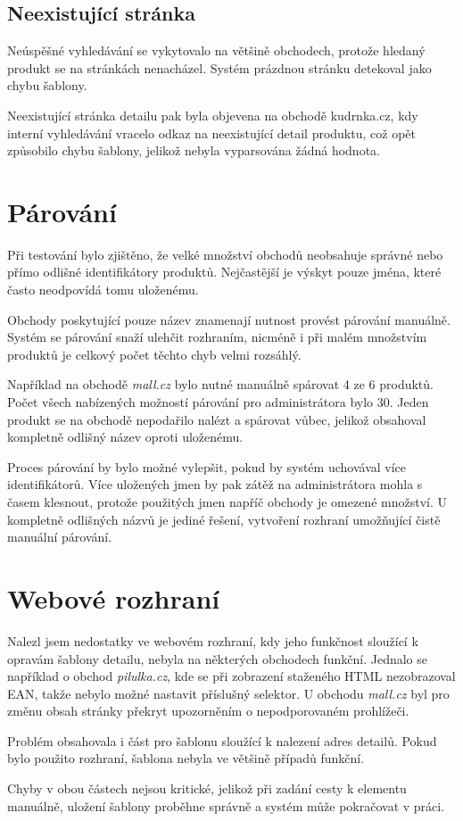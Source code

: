 \documentclass[thesis=B,czech]{FITthesis}[2012/06/26]
\begin{document}
\subsection{Neexistující stránka}
Neúspěšné vyhledávání se vykytovalo na většině obchodech, protože hledaný produkt se na stránkách nenacházel. Systém prázdnou stránku detekoval jako chybu šablony.
\par
Neexistující stránka detailu pak byla objevena na obchodě kudrnka.cz, kdy interní vyhledávání vracelo odkaz na neexistující detail produktu, což opět způsobilo chybu šablony, jelikož nebyla vyparsována žádná hodnota.

\section{Párování}
Při testování bylo zjištěno, že velké množství obchodů neobsahuje správné nebo přímo odlišné identifikátory produktů. Nejčastější je výskyt pouze jména, které často neodpovídá tomu uloženému.
\par
Obchody poskytující pouze název znamenají nutnost provést párování manuálně. Systém se párování snaží ulehčit rozhraním, nicméně i při malém množstvím produktů je celkový počet těchto chyb velmi rozsáhlý. 
\par
Například na obchodě \textit{mall.cz} bylo nutné manuálně spárovat 4 ze 6 produktů. Počet všech nabízených možností párování pro administrátora bylo 30. Jeden produkt se na obchodě nepodařilo nalézt a spárovat vůbec, jelikož obsahoval kompletně odlišný název oproti uloženému.
\par
Proces párování by bylo možné vylepšit, pokud by systém uchovával více identifikátorů. Více uložených jmen by pak zátěž na administrátora mohla s časem klesnout, protože použitých jmen napříč obchody je omezené množství.
U kompletně odlišných názvů je jediné řešení, vytvoření rozhraní umožňující čistě manuální párování.

\section{Webové rozhraní}\label{ch:web-interface}
Nalezl jsem nedostatky ve webovém rozhraní, kdy jeho funkčnost sloužící k opravám šablony detailu, nebyla na některých obchodech funkční.
Jednalo se například o obchod \textit{pilulka.cz}, kde se při zobrazení staženého HTML nezobrazoval EAN, takže nebylo možné nastavit příslušný selektor. 
U obchodu \textit{mall.cz} byl pro změnu obsah stránky překryt upozorněním o nepodporovaném prohlížeči.
\par
Problém obsahovala i část pro šablonu sloužící k nalezení adres detailů. Pokud bylo použito rozhraní, šablona nebyla ve většině
případů funkční. 
\par
Chyby v obou částech nejsou kritické, jelikož při zadání cesty k elementu manuálně, uložení šablony proběhne správně a systém může pokračovat
v práci.
\end{document}
